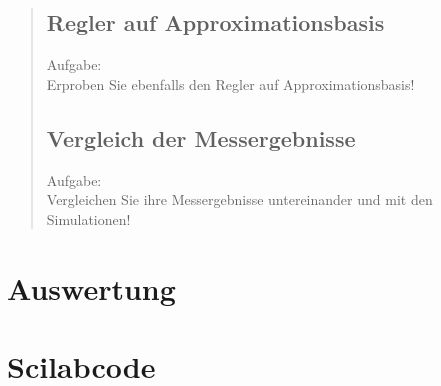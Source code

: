 \begin{quote}
    \subsection{Regler auf Approximationsbasis}
    
    Aufgabe:\\
    Erproben Sie ebenfalls den Regler auf Approximationsbasis!\vspace{1em}
    
    \begin{quote}
        
    \end{quote}
    
    
    \subsection{Vergleich der Messergebnisse}
    
    Aufgabe:\\
    Vergleichen Sie ihre Messergebnisse untereinander und mit den Simulationen!
    
    \begin{quote}
        
    \end{quote}
    
    
    
    
\end{quote}



\section{Auswertung}
\begin{quote}
    
\end{quote} %



\section{Scilabcode}
\begin{quote}
%     


\end{quote} %

